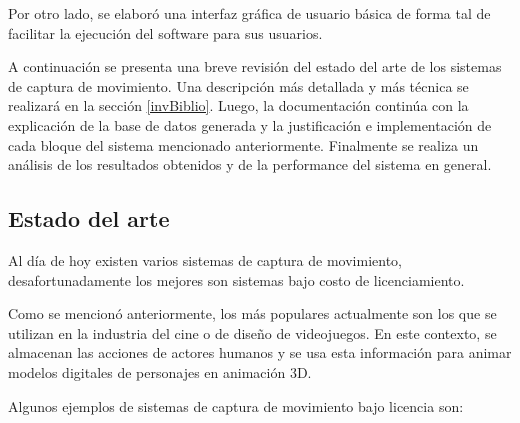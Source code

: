 Por otro lado, se elaboró una interfaz gráfica de usuario básica de forma tal de facilitar la ejecución del software para sus usuarios.

A continuación se presenta una breve revisión del estado del arte de los sistemas de captura de movimiento. Una descripción más detallada y más técnica se realizará en la sección \ref{invBiblio}. Luego, la documentación continúa con la explicación de la base de datos generada y la justificación e implementación de cada bloque del sistema mencionado anteriormente. Finalmente se realiza un análisis de los resultados obtenidos y de la performance del sistema en general.

\subsection{Estado del arte}

Al día de hoy existen varios sistemas de captura de movimiento, desafortunadamente los mejores son sistemas bajo costo de licenciamiento. 

Como se mencionó anteriormente, los más populares actualmente son los que se utilizan en la industria del cine o de diseño de videojuegos. En este contexto, se almacenan las acciones de actores humanos y se usa esta información para animar modelos digitales de personajes en animación 3D.

Algunos ejemplos de sistemas de captura de movimiento bajo licencia son:

